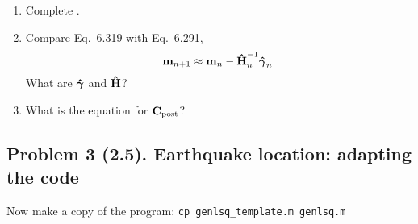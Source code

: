 \documentclass[11pt,titlepage,fleqn]{article}
\begin{document}
\begin{enumerate}
\begin{enumerate}
\vspace{1cm}

\item Complete .

\item Compare Eq.~6.319 with Eq.~6.291,
%
\begin{equation}
\mbox{${\bf m}$}_{n+1} \approx \mbox{${\bf m}$}_{n} - \mbox{\boldmath{$\hat{\rm H}$}}^{-1}_n \mbox{\boldmath{$\hat{\gamma}$}}_n.
\end{equation}
%
What are $\mbox{\boldmath{$\hat{\gamma}$}}$ and $\mbox{\boldmath{$\hat{\rm H}$}}$?

\vspace{1cm}

\item What is the equation for $\mbox{${\bf C}$}_{\rm post}$?

\end{enumerate}

\end{enumerate}


\clearpage\pagebreak
\subsection*{Problem 3 (2.5). Earthquake location: adapting the code}

Now make a copy of the program: \verb+cp genlsq_template.m genlsq.m+
\end{document}
